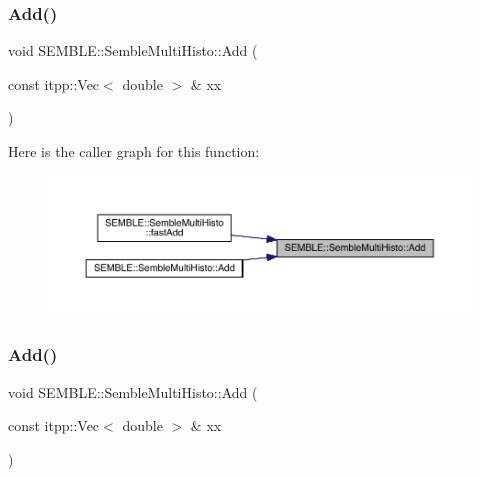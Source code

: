 \subsubsection{\texorpdfstring{Add()}{Add()}\hspace{0.1cm}{\footnotesize\ttfamily [1/4]}}
{\footnotesize\ttfamily void S\+E\+M\+B\+L\+E\+::\+Semble\+Multi\+Histo\+::\+Add (\begin{DoxyParamCaption}\item[{const itpp\+::\+Vec$<$ double $>$ \&}]{xx }\end{DoxyParamCaption})\hspace{0.3cm}{\ttfamily [inline]}}

Here is the caller graph for this function\+:
\nopagebreak
\begin{figure}[H]
\begin{center}
\leavevmode
\includegraphics[width=350pt]{d5/d58/structSEMBLE_1_1SembleMultiHisto_a45e4394dec6ca6da040f45088e9484fe_icgraph}
\end{center}
\end{figure}
\mbox{\label{structSEMBLE_1_1SembleMultiHisto_a45e4394dec6ca6da040f45088e9484fe}} 
\subsubsection{\texorpdfstring{Add()}{Add()}\hspace{0.1cm}{\footnotesize\ttfamily [2/4]}}
{\footnotesize\ttfamily void S\+E\+M\+B\+L\+E\+::\+Semble\+Multi\+Histo\+::\+Add (\begin{DoxyParamCaption}\item[{const itpp\+::\+Vec$<$ double $>$ \&}]{xx }\end{DoxyParamCaption})\hspace{0.3cm}{\ttfamily [inline]}}

\mbox{\label{structSEMBLE_1_1SembleMultiHisto_ac3f1fb8049db01afbfb7152bc98f7db3}} 
